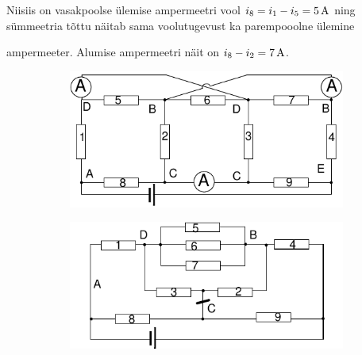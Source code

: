 Niisiis on vasakpoolse ülemise ampermeetri vool $i_8=i_1-i_5=\SI 5A$ ning sümmeetria tõttu näitab sama voolutugevust ka parempooolne ülemine
 
ampermeeter. Alumise ampermeetri näit on $i_8-i_2=\SI 7A$.\\

\begin{figure}[h]
    \centering
    \begin{subfigure}[h]{0.45\textwidth}
     \includegraphics[width=\textwidth]{2019-v3g-07-sol1.pdf}\\
    \end{subfigure}
    \begin{subfigure}[h]{0.45\textwidth}
    \vspace{-10pt}
     \includegraphics[width=\textwidth]{2019-v3g-07-sol2.pdf}
    \end{subfigure}
 \end{figure}
\probend